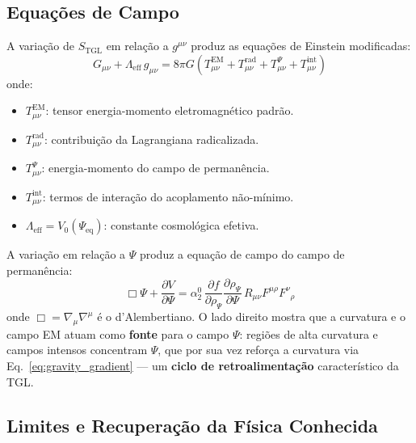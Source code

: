 \documentclass[12pt,a4paper,twoside]{article}
\newcommand{\Psifield}{\Psi}
\begin{document}
\subsection{Equa\c{c}\~oes de Campo}

A varia\c{c}\~ao de $S_{\text{TGL}}$ em rela\c{c}\~ao a $g^{\mu\nu}$ produz as equa\c{c}\~oes de Einstein modificadas:
\begin{equation}
G_{\mu\nu} + \Lambda_{\text{eff}}\, g_{\mu\nu} = 8\pi G\left(T_{\mu\nu}^{\text{EM}} + T_{\mu\nu}^{\text{rad}} + T_{\mu\nu}^{\Psifield} + T_{\mu\nu}^{\text{int}}\right)
\label{eq:modified_einstein}
\end{equation}
onde:
\begin{itemize}[nosep]
\item $T_{\mu\nu}^{\text{EM}}$: tensor energia-momento eletromagn\'etico padr\~ao.
\item $T_{\mu\nu}^{\text{rad}}$: contribui\c{c}\~ao da Lagrangiana radicalizada.
\item $T_{\mu\nu}^{\Psifield}$: energia-momento do campo de perman\^encia.
\item $T_{\mu\nu}^{\text{int}}$: termos de intera\c{c}\~ao do acoplamento n\~ao-m\'inimo.
\item $\Lambda_{\text{eff}} = V_0(\Psifield_{\text{eq}})$: constante cosmol\'ogica efetiva.
\end{itemize}

A varia\c{c}\~ao em rela\c{c}\~ao a $\Psifield$ produz a equa\c{c}\~ao de campo do campo de perman\^encia:
\begin{equation}
\Box\Psifield + \frac{\partial V}{\partial\Psifield} = \alpha_2^{0}\, \frac{\partial f}{\partial\rho_\Psifield}\frac{\partial\rho_\Psifield}{\partial\Psifield}\, R_{\mu\nu}F^{\mu\rho}F^{\nu}{}_{\rho}
\label{eq:psi_field_equation}
\end{equation}
onde $\Box = \nabla_\mu\nabla^\mu$ \'e o d'Alembertiano. O lado direito mostra que a curvatura e o campo EM atuam como \textbf{fonte} para o campo $\Psifield$: regi\~oes de alta curvatura e campos intensos concentram $\Psifield$, que por sua vez refor\c{c}a a curvatura via Eq.~\eqref{eq:gravity_gradient} --- um \textbf{ciclo de retroalimenta\c{c}\~ao} caracter\'istico da TGL.



\subsection{Limites e Recupera\c{c}\~ao da F\'isica Conhecida}
\end{document}

